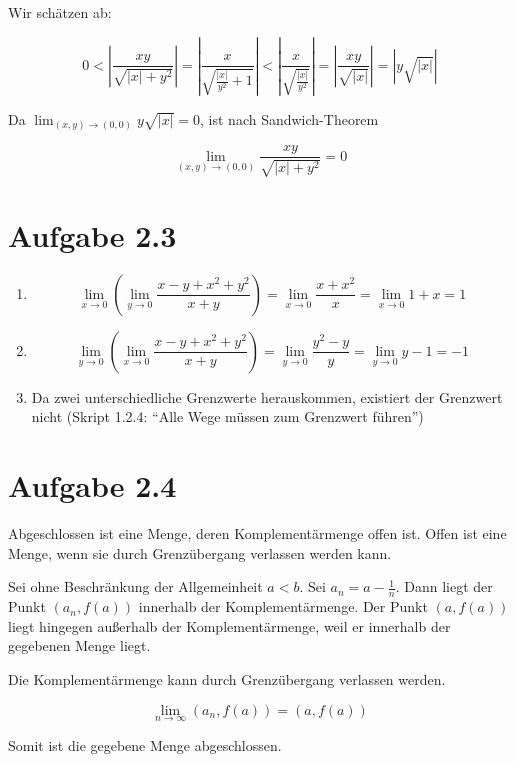 \documentclass[a4paper,german,12pt,smallheadings]{scrartcl}
\begin{document}
Wir schätzen ab:

\begin{equation*}
  0 <
  \left| \frac{xy}{\sqrt{|x| + y^2}}          \right| =
  \left| \frac{x}{\sqrt{\frac{|x|}{y^2} + 1}} \right| <
  \left| \frac{x}{\sqrt{\frac{|x|}{y^2}}}     \right| =
  \left| \frac{xy}{\sqrt{|x|}}                \right| =
  \left| y\sqrt{|x|}                          \right|
\end{equation*}

Da $\lim_{(x,y) \to (0,0)} y\sqrt{|x|} = 0$, ist nach Sandwich-Theorem

\begin{equation*}
  \lim_{(x,y) \to (0,0)} \frac{xy}{\sqrt{|x| + y^2}} = 0
\end{equation*}

\section*{Aufgabe 2.3}

\begin{enumerate}[(1)]
  \item
    \begin{equation*}
      \lim_{x \to 0} \left( \lim_{y \to 0} \frac{x-y+x^2+y^2}{x+y} \right) =
      \lim_{x \to 0} \frac{x+x^2}{x}  =
      \lim_{x \to 0} 1+x =
      1
    \end{equation*}
  \item
    \begin{equation*}
      \lim_{y \to 0} \left( \lim_{x \to 0} \frac{x-y+x^2+y^2}{x+y} \right) =
      \lim_{y \to 0} \frac{y^2-y}{y} =
      \lim_{y \to 0} y-1 =
      -1
    \end{equation*}
  \item
    Da zwei unterschiedliche Grenzwerte herauskommen, existiert der Grenzwert
    nicht (Skript 1.2.4: ``Alle Wege müssen zum Grenzwert führen'')
\end{enumerate}

\section*{Aufgabe 2.4}

Abgeschlossen ist eine Menge, deren Komplementärmenge offen ist. Offen ist eine
Menge, wenn sie durch Grenzübergang verlassen werden kann.

Sei ohne Beschränkung der Allgemeinheit $a < b$. Sei $a_n = a - \frac{1}{n}$.
Dann liegt der Punkt $(a_n, f(a))$ innerhalb der Komplementärmenge. Der Punkt
$(a, f(a))$ liegt hingegen außerhalb der Komplementärmenge, weil er innerhalb
der gegebenen Menge liegt.

Die Komplementärmenge kann durch Grenzübergang verlassen werden.

\begin{equation*}
  \lim_{n \to \infty} (a_n, f(a)) = (a, f(a))
\end{equation*}

Somit ist die gegebene Menge abgeschlossen.
\end{document}
